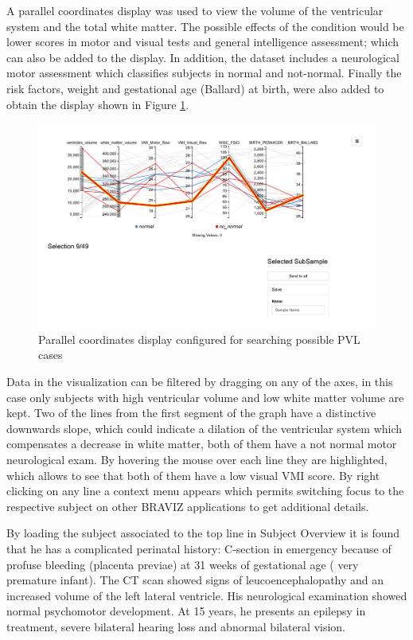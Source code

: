\documentclass[twocolumn]{svjour3}
\begin{document}
A parallel coordinates display was used to view the volume of the ventricular system and the total white matter. The possible effects of the condition would be lower scores in motor and visual tests and general intelligence assessment; which can also be added to the display. In addition, the dataset includes a neurological motor assessment which classifies subjects in normal and not-normal.  Finally the risk factors, weight and gestational age (Ballard) at birth, were also added to obtain the display shown in Figure \ref{fig_parallel}.

\begin{figure}
\begin{center}
\includegraphics[width=\linewidth,trim = 30mm 90mm 60mm 10mm ,clip]{parallel_coordinates_raw}
\end{center}
 \caption{\label{fig_parallel}Parallel coordinates display configured for searching possible PVL cases}
\end{figure}

Data in the visualization can be filtered by dragging on any of the axes, in this case only subjects with high ventricular volume and low white matter volume are kept. Two of the lines from the first segment of the graph have a distinctive downwards slope, which could indicate a dilation of the ventricular system which compensates a decrease in white matter, both of them have a not normal motor neurological exam. By hovering the mouse over each line they are highlighted, which allows to see that both of them have a low visual VMI score. By right clicking on any line a context menu appears which permits switching focus to the respective subject on other BRAVIZ applications to get additional details. 

By loading the subject associated to the top line in Subject Overview it is found that he has a complicated perinatal history: C-section in emergency because of profuse bleeding (placenta previae) at 31 weeks of gestational age ( very premature infant). The  CT scan showed signs of leucoencephalopathy  and an  increased volume of the left lateral ventricle. His neurological examination showed normal psychomotor development. At 15 years, he presents an epilepsy in  treatment, severe bilateral hearing loss and abnormal bilateral vision.  
\end{document}
